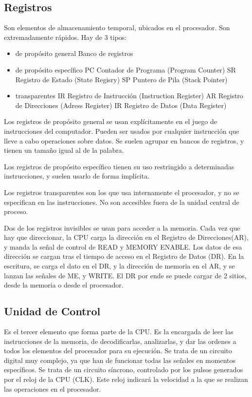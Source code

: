 \documentclass[a4paper,11pt,spanish]{report}
\begin{document}
\subsection{Registros}
Son elementos de almacenamiento temporal, ubicados en el procesador. Son extremadamente rápidos. Hay de 3 tipos:
\begin{itemize}
\item de propósito general
\subitem Banco de registros
\item de propósito específico
\subitem PC \textrightarrow Contador de Programa (Program Counter)
\subitem SR \textrightarrow Registro de Estado (State Regisry)
\subitem SP \textrightarrow Puntero de Pila (Stack Pointer)
\item transparentes
\subitem IR \textrightarrow Registro de Instrucción (Instruction Register)
\subitem AR \textrightarrow Registro de Direcciones (Adress Register)
\subitem IR \textrightarrow Registro de Datos (Data Register)
\end{itemize}
Los registros de propósito general se usan explícitamente en el juego de instrucciones del computador. Pueden ser usados por cualquier instrucción que lleve a cabo operaciones sobre datos. Se suelen agrupar en bancos de registros, y tienen un tamaño igual al de la palabra.

Los registros de propósito específico tienen su uso restringido a determinadas instrucciones, y suelen usarlo de forma implícita.

Los registros transparentes son los que usa internamente el procesador, y no se especifican en las instrucciones. No son accesibles fuera de la unidad central de proceso.

Dos de los registros invisibles se usan para acceder a la memoria. Cada vez que hay que direccionar, la CPU carga la dirección en el Registro de Direcciones(AR), y manda la señal de control de READ y MEMORY ENABLE. Los datos de esa dirección se cargan tras el tiempo de acceso en el Registro de Datos (DR). En la escritura, se carga el dato en el DR, y la dirección de memoria en el AR, y se lanzan las señales de ME, y WRITE. El DR por ende se puede cargar de 2 sitios, desde la memoria o desde el procesador.

\subsection {Unidad de Control}
Es el tercer elemento que forma parte de la CPU. Es la encargada de leer las instrucciones de la memoria, de decodificarlas, analizarlas, y dar las ordenes a todos los elementos del procesador para su ejecución. Se trata de un circuito digital muy complejo, ya que han de funcionar todas las señales en momentos específicos. Se trata de un circuito síncrono, controlado por los pulsos generados por el reloj de la CPU (CLK). Este reloj indicará la velocidad a la que se realizan las operaciones en el procesador.
\end{document}
